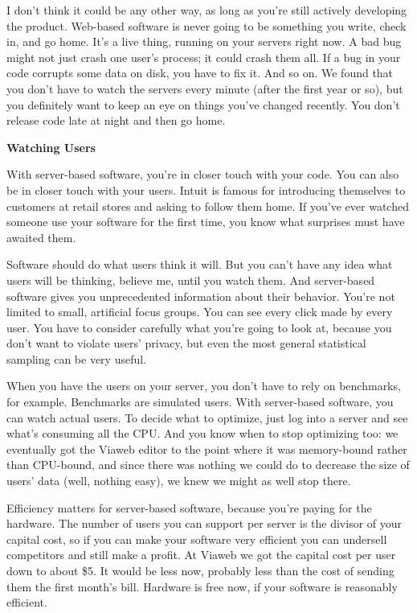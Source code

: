 I don't think it could be any other way, as long as you're still
actively developing the product. Web-based software is never going to be
something you write, check in, and go home. It's a live thing, running
on your servers right now. A bad bug might not just crash one user's
process; it could crash them all. If a bug in your code corrupts some
data on disk, you have to fix it. And so on. We found that you don't
have to watch the servers every minute (after the first year or so), but
you definitely want to keep an eye on things you've changed recently.
You don't release code late at night and then go home.

\textbf{Watching Users}

With server-based software, you're in closer touch with your code. You
can also be in closer touch with your users. Intuit is famous for
introducing themselves to customers at retail stores and asking to
follow them home. If you've ever watched someone use your software for
the first time, you know what surprises must have awaited them.

Software should do what users think it will. But you can't have any idea
what users will be thinking, believe me, until you watch them. And
server-based software gives you unprecedented information about their
behavior. You're not limited to small, artificial focus groups. You can
see every click made by every user. You have to consider carefully what
you're going to look at, because you don't want to violate users'
privacy, but even the most general statistical sampling can be very
useful.

When you have the users on your server, you don't have to rely on
benchmarks, for example. Benchmarks are simulated users. With
server-based software, you can watch actual users. To decide what to
optimize, just log into a server and see what's consuming all the CPU.
And you know when to stop optimizing too: we eventually got the Viaweb
editor to the point where it was memory-bound rather than CPU-bound, and
since there was nothing we could do to decrease the size of users' data
(well, nothing easy), we knew we might as well stop there.

Efficiency matters for server-based software, because you're paying for
the hardware. The number of users you can support per server is the
divisor of your capital cost, so if you can make your software very
efficient you can undersell competitors and still make a profit. At
Viaweb we got the capital cost per user down to about \$5. It would be
less now, probably less than the cost of sending them the first month's
bill. Hardware is free now, if your software is reasonably efficient.


